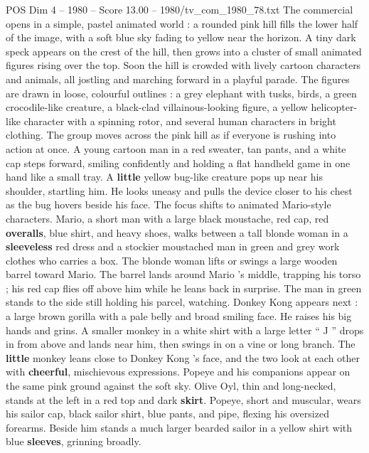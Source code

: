 \begin{textsample}{POS Dim 4 – 1980 – Score 13.00 – 1980/tv\_com\_1980\_78.txt}  \label{ex:f4_pos_047}
The commercial opens in a simple, pastel animated world : a rounded pink hill fills the lower half of the image, with a soft blue sky fading to yellow near the horizon.
A tiny dark speck appears on the crest of the hill, then grows into a cluster of small animated figures rising over the top.
Soon the hill is crowded with lively cartoon characters and animals, all jostling and marching forward in a playful parade.
The figures are drawn in loose, colourful outlines : a grey elephant with tusks, birds, a green crocodile-like creature, a black-clad villainous-looking figure, a yellow helicopter-like character with a spinning rotor, and several human characters in bright clothing.
The group moves across the pink hill as if everyone is rushing into action at once.
A young cartoon man in a red sweater, tan pants, and a white cap steps forward, smiling confidently and holding a flat handheld game in one hand like a small tray.
A \textbf{little} yellow bug-like creature pops up near his shoulder, startling him.
He looks uneasy and pulls the device closer to his chest as the bug hovers beside his face.
The focus shifts to animated Mario-style characters.
Mario, a short man with a large black moustache, red cap, red \textbf{overalls}, blue shirt, and heavy shoes, walks between a tall blonde woman in a \textbf{sleeveless} red dress and a stockier moustached man in green and grey work clothes who carries a box.
The blonde woman lifts or swings a large wooden barrel toward Mario.
The barrel lands around Mario ’s middle, trapping his torso ; his red cap flies off above him while he leans back in surprise.
The man in green stands to the side still holding his parcel, watching.
Donkey Kong appears next : a large brown gorilla with a pale belly and broad smiling face.
He raises his big hands and grins.
A smaller monkey in a white shirt with a large letter “ J ” drops in from above and lands near him, then swings in on a vine or long branch.
The \textbf{little} monkey leans close to Donkey Kong ’s face, and the two look at each other with \textbf{cheerful}, mischievous expressions.
Popeye and his companions appear on the same pink ground against the soft sky.
Olive Oyl, thin and long-necked, stands at the left in a red top and dark \textbf{skirt}.
Popeye, short and muscular, wears his sailor cap, black sailor shirt, blue pants, and pipe, flexing his oversized forearms.
Beside him stands a much larger bearded sailor in a yellow shirt with blue \textbf{sleeves}, grinning broadly.

\end{textsample}
